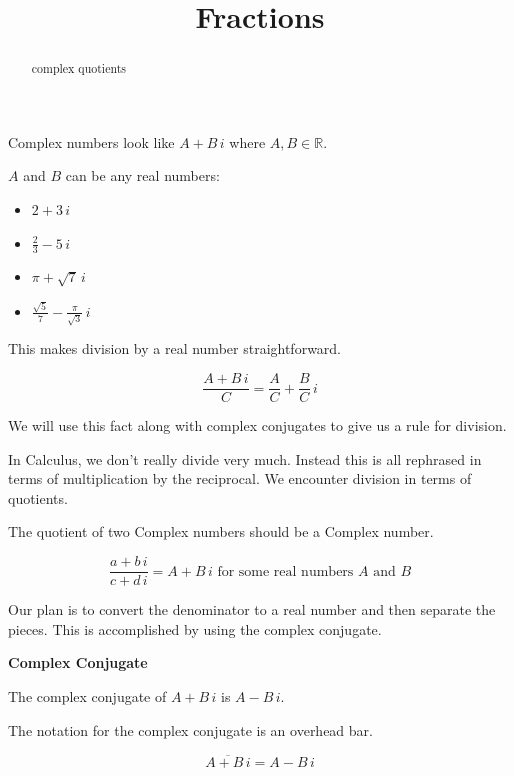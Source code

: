 \documentclass{ximera}
\title{Fractions}
\begin{document}
\begin{abstract}
complex quotients
\end{abstract}
\maketitle




Complex numbers look like $A + B \, i$ where $A, B \in \mathbb{R}$.


$A$ and $B$ can be any real numbers:



\begin{itemize}
	\item $2 + 3 \, i$
	\item $\frac{2}{3} - 5 \, i$
	\item $\pi + \sqrt{7} \, i$
	\item $\frac{\sqrt{5}}{7} - \frac{\pi}{\sqrt{3}} \, i$
\end{itemize}



This makes division by a real number straightforward.




\[
\frac{A + B \, i}{C} = \frac{A}{C} + \frac{B}{C} \, i
\]





We will use this fact along with complex conjugates to give us a rule for division.



In Calculus, we don't really divide very much.  Instead this is all rephrased in terms of multiplication by the reciprocal.  We encounter division in terms of quotients.


The quotient of two Complex numbers should be a Complex number.

\[
\frac{a + b \, i}{c + d \, i}  = A + B \, i  \text{ for some real numbers } A \text{ and } B
\]


Our plan is to convert the denominator to a real number and then separate the pieces.  This is accomplished by using the complex conjugate.

\begin{definition}  \textbf{\textcolor{green!50!black}{Complex Conjugate}} 


The complex conjugate of $A + B \, i$ is $A - B \, i$. 


The notation for the complex conjugate is an overhead bar.

\[
\overline{A + B \, i} = A - B \, i
\]


\end{definition}
\end{document}
